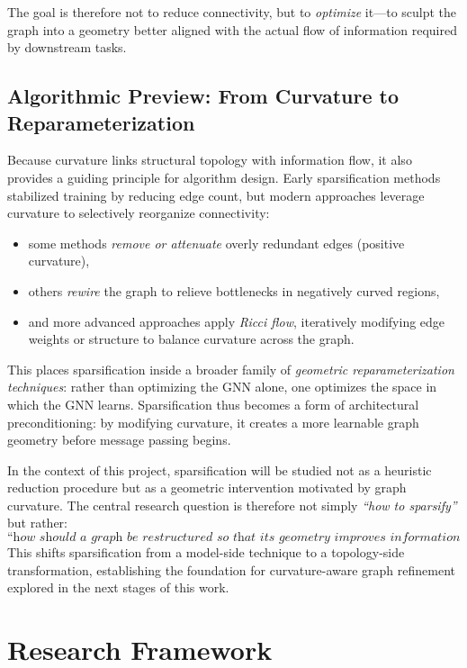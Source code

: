 \documentclass[letterpaper,12pt]{article}
\begin{document}
The goal is therefore not to reduce connectivity, but to \textit{optimize} it---to sculpt the graph into a geometry better aligned with the actual flow of information required by downstream tasks.

\subsection{Algorithmic Preview: From Curvature to Reparameterization}

Because curvature links structural topology with information flow, it also provides a guiding principle for algorithm design. Early sparsification methods stabilized training by reducing edge count, but modern approaches leverage curvature to selectively reorganize connectivity:
\begin{itemize}
    \item some methods \textit{remove or attenuate} overly redundant edges (positive curvature),
    \item others \textit{rewire} the graph to relieve bottlenecks in negatively curved regions,
    \item and more advanced approaches apply \textit{Ricci flow}, iteratively modifying edge weights or structure to balance curvature across the graph.
\end{itemize}

This places sparsification inside a broader family of \emph{geometric reparameterization techniques}: rather than optimizing the GNN alone, one optimizes the space in which the GNN learns. Sparsification thus becomes a form of architectural preconditioning: by modifying curvature, it creates a more learnable graph geometry before message passing begins.

In the context of this project, sparsification will be studied not as a heuristic reduction procedure but as a geometric intervention motivated by graph curvature. The central research question is therefore not simply \textit{``how to sparsify''} but rather:
\[
\textit{“how should a graph be restructured so that its geometry improves information flow for learning?”}
\]
This shifts sparsification from a model-side technique to a topology-side transformation, establishing the foundation for curvature-aware graph refinement explored in the next stages of this work.

\section{Research Framework}
\end{document}
